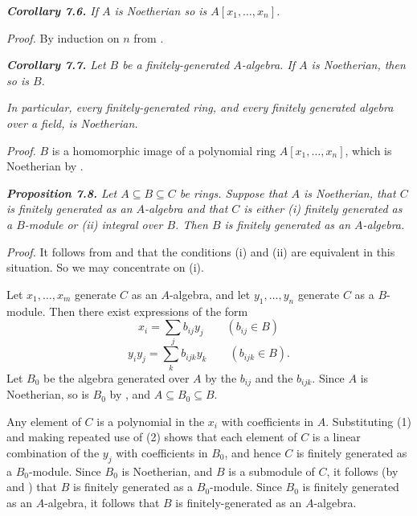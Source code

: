 \medskip
\noindent\textit{\textbf{Corollary 7.6.} If $A$ is Noetherian so is $A[x_1,\ldots,x_n]$.}

\noindent\emph{Proof.}  By induction on $n$ from .\proofbox

\medskip
\noindent\textit{\textbf{Corollary 7.7.} Let $B$ be a finitely-generated $A$-algebra.  If $A$ is Noetherian,
then so is $B$.}

\noindent\textit{
In particular, every finitely-generated ring, and every finitely generated
algebra over a field, is Noetherian.}

\noindent\emph{Proof.}  $B$ is a homomorphic image of a polynomial ring $A[x_1,\ldots,x_n]$, which is
Noetherian by .\proofbox

\medskip
\noindent\textit{\textbf{Proposition 7.8.} Let $A\subseteq B\subseteq C$ be rings.  Suppose that $A$ is Noetherian,
that $C$ is finitely generated as an $A$-algebra and that $C$ is either (i) finitely
generated as a $B$-module or (ii) integral over $B$.  Then $B$ is finitely generated
as an $A$-algebra.}

\noindent\emph{Proof.}  It follows from  and  that the conditions (i) and (ii) are equivalent in this situation.  So we may concentrate on (i).

Let $x_1,\ldots,x_m$ generate $C$ as an $A$-algebra, and let $y_1,\ldots,y_n$ generate $C$ as a
$B$-module.  Then there exist expressions of the form
\begin{equation}
x_i=\sum_j b_{ij}y_j\qquad(b_{ij}\in B)
\tag{1}
\end{equation}
\begin{equation}
y_iy_j=\sum_k b_{ijk}y_k\qquad(b_{ijk}\in B).
\tag{2}
\end{equation}
Let $B_0$ be the algebra generated over $A$ by the $b_{ij}$ and the $b_{ijk}$.  Since $A$ is
Noetherian, so is $B_0$ by , and $A\subseteq B_0\subseteq B$.

Any element of $C$ is a polynomial in the $x_i$ with coefficients in $A$.  Substituting (1) and making repeated use of (2) shows that each element of $C$ is a
linear combination of the $y_j$ with coefficients in $B_0$, and hence $C$ is finitely
generated as a $B_0$-module.  Since $B_0$ is Noetherian, and $B$ is a submodule of $C$,
it follows (by  and ) that $B$ is finitely generated as a $B_0$-module.  Since
$B_0$ is finitely generated as an $A$-algebra, it follows that $B$ is finitely-generated as
an $A$-algebra.\proofbox

